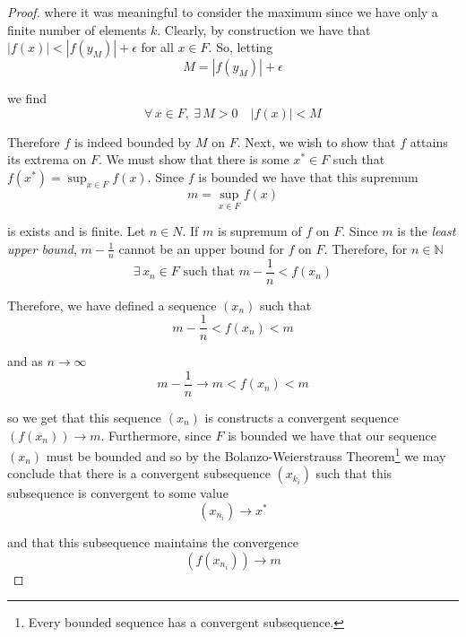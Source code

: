 \documentclass[12pt]{article}
\newlength\tindent
\renewcommand{\indent}{\hspace*{\tindent}}
\newcommand{\N}{\mathbb N}
\begin{document}
\begin{proof}
where it was meaningful to consider the maximum since we have only a finite number of elements $k$. Clearly, by construction we have that $|f(x)| < |f(y_M)| + \epsilon$ for all $x \in F$. So, letting
\begin{equation*}
	M = |f(y_M)| + \epsilon
\end{equation*}

we find
\begin{equation*}
	\forall\,x\in F,~\exists\,M > 0 \quad |f(x)| < M
\end{equation*}

\indent Therefore $f$ is indeed bounded by $M$ on $F$. Next, we wish to show that $f$ attains its extrema on $F$. We must show that there is some $x^* \in F$ such that $f(x^*) = \sup_{x\in F} f(x)$. Since $f$ is bounded we have that this supremum
\begin{equation*}
	m = \sup_{x\in F} f(x)	
\end{equation*}

is exists and is finite. Let $n \in N$. If $m$ is supremum of $f$ on $F$. Since $m$ is the {\em least upper bound}, $m - \frac{1}{n}$ cannot be an upper bound for $f$ on $F$. Therefore, for $n \in \N$ 
\begin{equation*}
	\exists\,x_n \in F \text{ such that } m - \frac{1}{n} < f(x_n)
\end{equation*}

Therefore, we have defined a sequence $(x_n)$ such that
\begin{equation*}
	m - \frac{1}{n} < f(x_n) < m
\end{equation*}

and as $n \to \infty$
\begin{equation*}
	m - \frac{1}{n} \to m < f(x_n) < m
\end{equation*}

so we get that this sequence $(x_n)$ is constructs a convergent sequence $(f(x_n)) \to m$. Furthermore, since $F$ is bounded we have that our sequence $(x_n)$ must be bounded and so by the Bolanzo-Weierstrauss Theorem\footnote{Every bounded sequence has a convergent subsequence.} we may conclude that there is a convergent subsequence $(x_{k_i})$ such that this subsequence is convergent to some value
\begin{equation*}
	(x_{n_i}) \to x^*
\end{equation*}

and that this subsequence maintains the convergence
\begin{equation*}
	(f(x_{n_i})) \to m
\end{equation*}


\end{proof}
\end{document}
